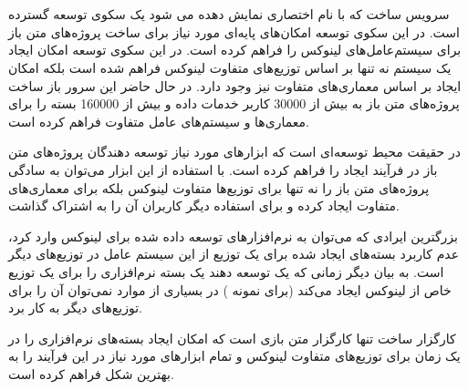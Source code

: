 

\section{}

سرویس ساخت  که با نام اختصاری
 نمایش دهده می شود یک سکوی توسعه گسترده است. در این سکوی توسعه امکان‌های پایه‌ای مورد
نیاز برای ساخت پروژه‌های متن باز برای سیستم‌عامل‌های لینوکس را فراهم کرده است.
در این سکوی توسعه امکان ایجاد یک سیستم نه تنها بر اساس توزیع‌های متفاوت لینوکس
فراهم شده است بلکه امکان ایجاد بر اساس معماری‌های متفاوت نیز وجود دارد. در حال
حاضر این سرور باز ساخت پروژه‌های متن باز به بیش از 30000 کاربر خدمات داده و بیش
از 160000 بسته را برای معماری‌ها و سیستم‌های عامل متفاوت فراهم کرده
است\cite{buildopensuse}.


 در حقیقت محیط توسعه‌ای است که ابزارهای مورد نیاز توسعه دهندگان
پروژه‌های متن باز در فرآیند ایجاد را فراهم کرده است. با استفاده از این ابزار
می‌توان به سادگی پروژه‌های متن باز را نه تنها برای توزیع‌ها متفاوت لینوکس بلکه
برای معماری‌های متفاوت ایجاد کرده و برای استفاده دیگر کاربران آن را به اشتراک
گذاشت.

بزرگترین ایرادی که می‌توان به نرم‌افزارهای توسعه داده شده برای لینوکس وارد کرد،
عدم کاربرد بسته‌های ایجاد شده برای یک توزیع از این سیستم عامل در توزیع‌های دیگر
است. به بیان دیگر زمانی که یک توسعه دهند یک بسته نرم‌افزاری را برای یک توزیع خاص
از لینوکس ایجاد می‌کند (برای نمونه ) در بسیاری از موارد نمی‌توان آن
را برای توزیع‌های دیگر به کار برد.

کارگزار ساخت  تنها کارگزار متن بازی است که امکان ایجاد بسته‌های
نرم‌افزاری را در یک زمان برای توزیع‌های متفاوت لینوکس و تمام
ابزارهای مورد نیاز در این فرآیند را به بهترین شکل  فراهم کرده است.

%

